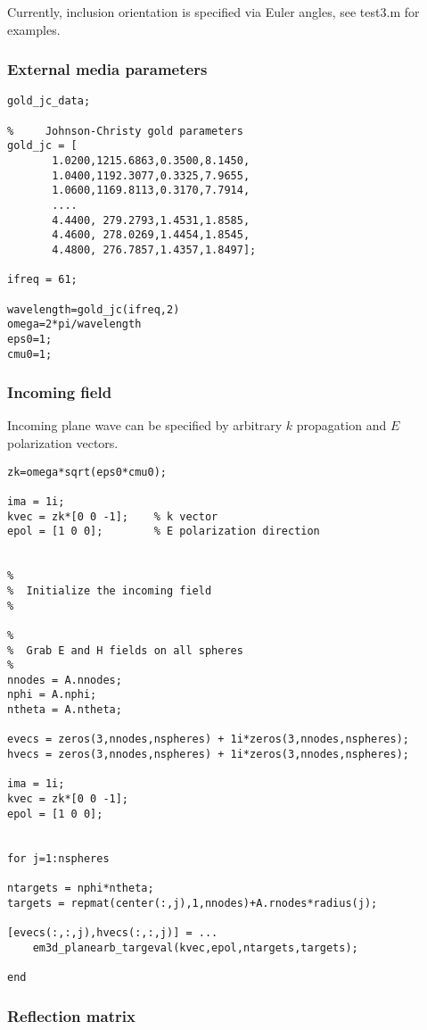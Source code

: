 \documentclass{article}
\begin{document}
Currently, inclusion orientation is specified via Euler angles, see
test3.m for examples.


\subsubsection{ External media parameters}

\begin{verbatim}
gold_jc_data;   

%     Johnson-Christy gold parameters
gold_jc = [
       1.0200,1215.6863,0.3500,8.1450,
       1.0400,1192.3077,0.3325,7.9655,
       1.0600,1169.8113,0.3170,7.7914,
       ....
       4.4400, 279.2793,1.4531,1.8585,
       4.4600, 278.0269,1.4454,1.8545,
       4.4800, 276.7857,1.4357,1.8497];

ifreq = 61;

wavelength=gold_jc(ifreq,2)
omega=2*pi/wavelength
eps0=1;
cmu0=1;
\end{verbatim}

\subsubsection{ Incoming field}

Incoming plane wave can be specified by arbitrary $k$ propagation and $E$
polarization vectors.

\begin{verbatim}
zk=omega*sqrt(eps0*cmu0);

ima = 1i;
kvec = zk*[0 0 -1];    % k vector
epol = [1 0 0];        % E polarization direction


%
%  Initialize the incoming field
%

%
%  Grab E and H fields on all spheres
%
nnodes = A.nnodes;
nphi = A.nphi;
ntheta = A.ntheta;

evecs = zeros(3,nnodes,nspheres) + 1i*zeros(3,nnodes,nspheres);
hvecs = zeros(3,nnodes,nspheres) + 1i*zeros(3,nnodes,nspheres);

ima = 1i;
kvec = zk*[0 0 -1];
epol = [1 0 0];


for j=1:nspheres

ntargets = nphi*ntheta;
targets = repmat(center(:,j),1,nnodes)+A.rnodes*radius(j);

[evecs(:,:,j),hvecs(:,:,j)] = ...
    em3d_planearb_targeval(kvec,epol,ntargets,targets);

end
\end{verbatim}

\subsubsection{ Reflection matrix}
\end{document}
